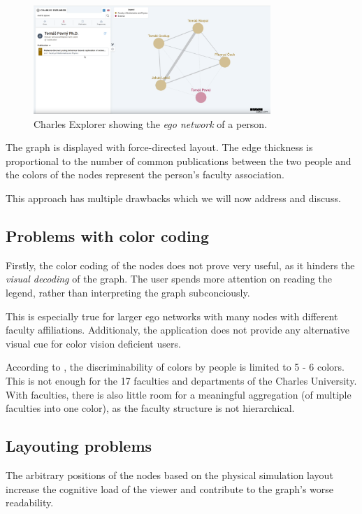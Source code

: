 \begin{figure}[ht!]
    \includegraphics[width=0.8\textwidth]{../img/charles-explorer-old-view.png}
    \centering
    \caption{Charles Explorer showing the \textit{ego network} of a person.}
\end{figure}

The graph is displayed with force-directed layout. The edge thickness is proportional to the number of common publications between 
the two people and the colors of the nodes represent the person's faculty association.

This approach has multiple drawbacks which we will now address and discuss.

\subsection{Problems with color coding}

Firstly, the color coding of the nodes does not prove very useful, as it hinders the \textit{visual decoding} of the graph.
The user spends more attention on reading the legend, rather than interpreting the graph subconciously.

This is especially true for larger ego networks with many nodes with different faculty affiliations. 
Additionaly, the application does not provide any alternative visual cue for color vision deficient users.

According to \cite{Cleveland1985}, the discriminability of colors by people is limited to 5 - 6 colors. This is not enough for the 17 faculties and departments 
of the Charles University. With faculties, there is also little room for a meaningful aggregation (of multiple faculties into one color), as the faculty structure is not 
hierarchical.

\subsection{Layouting problems}

The arbitrary positions of the nodes based on the physical simulation layout increase the cognitive load 
of the viewer and contribute to the graph's worse readability.

